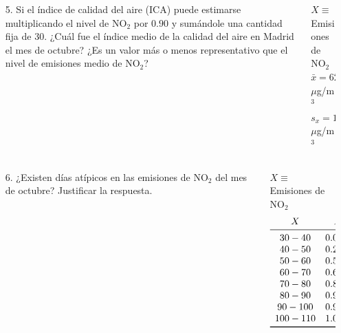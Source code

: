 \documentclass[aspectratio=149,10pt,t]{beamer}
\begin{document}
\begin{frame}
	\begin{columns}
		\begin{column}[T]{0.65\textwidth}
			\begin{enumerate}
				\item[5.] Si el índice de calidad del aire (ICA) puede estimarse multiplicando el nivel de NO$_2$ por $0.90$ y sumándole una cantidad fija de 30. 
		¿Cuál fue el índice medio de la calidad del aire en Madrid el mes de octubre? 
		¿Es un valor más o menos representativo que el nivel de emisiones medio de NO$_2$?
			\end{enumerate}
		\end{column}
		\begin{column}[T]{0.35\textwidth}
			\begin{datos}
				$X\equiv$ Emisiones de NO$_2$\\
				$\bar x = 62.7419$ $\mu$g/m$^3$\\
				$s_x=17.5444$ $\mu$g/m$^3$\\
			\end{datos}
		\end{column}
	\end{columns}
\end{frame}


\begin{frame}
	\begin{columns}
		\begin{column}[T]{0.7\textwidth}
			\begin{enumerate}
				\item[6.] ¿Existen días atípicos en las emisiones de NO$_2$ del mes de octubre? Justificar la respuesta.
			\end{enumerate}
		\end{column}
		\begin{column}[T]{0.3\textwidth}
			\begin{datos}
			$X\equiv$ Emisiones de NO$_2$\\
			\[
				\begin{array}{cc}
					X & F_i\\
					\midrule
					30 - 40 & 0.0645\\
    			40 - 50 & 0.2581\\
    			50 - 60 & 0.5161\\
    			60 - 70 & 0.6774\\
    			70 - 80 & 0.8387\\
    			80 - 90 & 0.9032\\
    			90 - 100 & 0.9677\\
    			100 - 110 & 1.0000\\
					\bottomrule
				\end{array}
			\]
			\end{datos}
		\end{column}
	\end{columns}
\end{frame}
\end{document}
